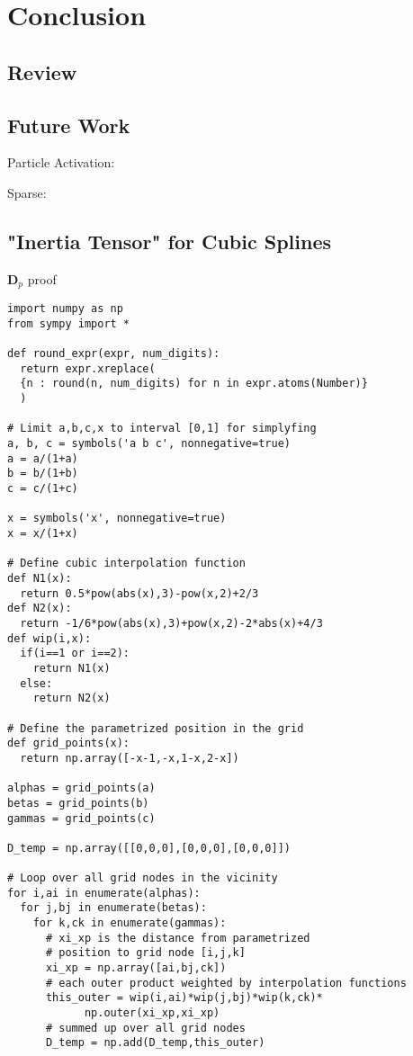 \documentclass[m,times]{cgMA}
\newenvironment{code}{\captionsetup{type=algorithm}}{}
\begin{document}
\section{Conclusion}
\subsection{Review}
\subsection{Future Work}
Particle Activation: \cite{MPM:GPU}

Sparse: \cite{OPENVDB} \cite{NVIDIA:GVDB_VOXELS}
\clearpage
\begin{appendices}
  \section{"Inertia Tensor" for Cubic Splines}\label{app:dp_proof}
  \begin{code}
\caption{$\boldsymbol{D}_p$ proof}
  \begin{verbatim}
import numpy as np
from sympy import *

def round_expr(expr, num_digits):
  return expr.xreplace(
  {n : round(n, num_digits) for n in expr.atoms(Number)}
  )

# Limit a,b,c,x to interval [0,1] for simplyfing
a, b, c = symbols('a b c', nonnegative=true)
a = a/(1+a)
b = b/(1+b)
c = c/(1+c)

x = symbols('x', nonnegative=true)
x = x/(1+x)

# Define cubic interpolation function
def N1(x):
  return 0.5*pow(abs(x),3)-pow(x,2)+2/3
def N2(x):
  return -1/6*pow(abs(x),3)+pow(x,2)-2*abs(x)+4/3
def wip(i,x):
  if(i==1 or i==2):
    return N1(x)
  else:
    return N2(x)

# Define the parametrized position in the grid
def grid_points(x):
  return np.array([-x-1,-x,1-x,2-x])

alphas = grid_points(a)
betas = grid_points(b)
gammas = grid_points(c)

D_temp = np.array([[0,0,0],[0,0,0],[0,0,0]])

# Loop over all grid nodes in the vicinity
for i,ai in enumerate(alphas):
  for j,bj in enumerate(betas):
    for k,ck in enumerate(gammas):
      # xi_xp is the distance from parametrized
      # position to grid node [i,j,k]
      xi_xp = np.array([ai,bj,ck])
      # each outer product weighted by interpolation functions
      this_outer = wip(i,ai)*wip(j,bj)*wip(k,ck)*
		    np.outer(xi_xp,xi_xp)
      # summed up over all grid nodes
      D_temp = np.add(D_temp,this_outer)


\end{verbatim}
\end{code}
\end{appendices}
\end{document}
